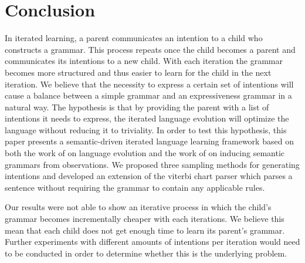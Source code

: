 \documentclass[a4paper]{article}
\begin{document}
\section{Conclusion} %
\label{sec:conclusion}
In iterated learning, a parent communicates an intention to a child who constructs a grammar. This process repeats once the child becomes a parent and communicates its intentions to a new child. With each iteration the grammar becomes more structured and thus easier to learn for the child in the next iteration. We believe that the necessity to express a certain set of intentions will cause a balance between a simple grammar and an expressiveness grammar in a natural way. The hypothesis is that by providing the parent with a list of intentions it needs to express, the iterated language evolution will optimize the language without reducing it to triviality. In order to test this hypothesis, this paper presents a semantic-driven iterated language learning framework based on both the work of \cite{zuidema2003poverty} on language evolution and the work of \cite{batali1999negotiation} on inducing semantic grammars from observations. We proposed three sampling methods for generating intentions and developed an extension of the viterbi chart parser which parses a sentence without requiring the grammar to contain any applicable rules.

Our results were not able to show an iterative process in which the child's grammar becomes incrementally cheaper with each iterations. We believe this mean that each child does not get enough time to learn its parent's grammar. Further experiments with different amounts of intentions per iteration would need to be conducted in order to determine whether this is the underlying problem.




\end{document}
